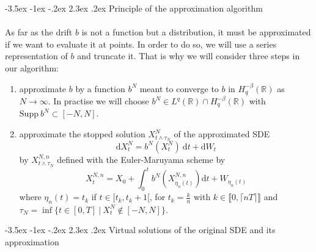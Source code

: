 \documentclass[11pt]{enstaPRE}
\makeatletter
\renewcommand\section{\@startsection {section}{1}{\z@}%
    {-3.5ex \@plus -1ex \@minus -.2ex}%
    {2.3ex \@plus.2ex}%
    {\centering\large\scshape\bfseries}}
\newcommand{\R}{\mathbb{R}}
\newcommand{\di}{\mathrm{d}}
\makeatother
\begin{document}
\section{Principle of the approximation algorithm}
    
    \paragraph{}
    As far as the drift $b$ is not a function but a distribution, it must be approximated if we want to evaluate it at points. In order to do so, we will use a series representation of $b$ and truncate it. That is why we will consider three steps in our algorithm:
     \begin{enumerate}
       \item approximate $b$ by a function $b^N$ meant to converge to $b$ in $H^{-\beta}_q(\R)$ as $N\rightarrow\infty$. In practise we will choose $b^N\in L^q(\R)\cap H^{-\beta}_q(\R)$ with $\mathrm{Supp}\ b^N\subset[-N,N]$.
        \item approximate the stopped solution $X^N_{t\wedge\tau_N}$ of the approximated SDE
       \begin{equation} \label{sde2}
       \di X^N_t = b^N\left(X^N_t\right)\ \di t + \di W_t
        \end{equation} 
        by $X^{N,n}_{t\wedge\tau_N}$ defined with the Euler-Maruyama scheme by
        \begin{equation}\label{euler}
        X^{N,n}_t = X_0 + \int_0^t b^N\left(X^{N,n}_{\eta_n(t)}\right)\di t + W_{\eta_n(t)}
        \end{equation}
        where $\eta_n(t)=t_k$ if $t\in[t_k,t_k+1[$, for $t_k=\frac{k}{n}$ with $ k\in\llbracket0,\lceil nT\rceil\rrbracket$ 
        and $\tau_N = \inf\{t\in[0,T]\ |\ X^N_t\notin[-N,N]\}$.
        
   \end{enumerate}

\section{Virtual solutions of the original SDE and its approximation}
\end{document}
